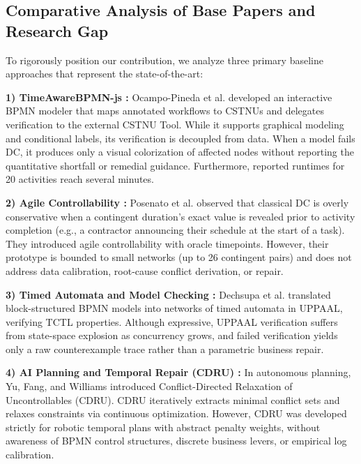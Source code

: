 \documentclass[conference]{IEEEtran}
\begin{document}
\subsection{Comparative Analysis of Base Papers and Research Gap}
To rigorously position our contribution, we analyze three primary baseline approaches that represent the state-of-the-art:

\textbf{1) TimeAwareBPMN-js \cite{ocampo2022}:} Ocampo-Pineda et al. developed an interactive BPMN modeler that maps annotated workflows to CSTNUs and delegates verification to the external CSTNU Tool. While it supports graphical modeling and conditional labels, its verification is decoupled from data. When a model fails DC, it produces only a visual colorization of affected nodes without reporting the quantitative shortfall or remedial guidance. Furthermore, reported runtimes for 20 activities reach several minutes.

\textbf{2) Agile Controllability \cite{posenato2024}:} Posenato et al. observed that classical DC is overly conservative when a contingent duration's exact value is revealed prior to activity completion (e.g., a contractor announcing their schedule at the start of a task). They introduced agile controllability with oracle timepoints. However, their prototype is bounded to small networks (up to 26 contingent pairs) and does not address data calibration, root-cause conflict derivation, or repair.

\textbf{3) Timed Automata and Model Checking \cite{dechsupa2025}:} Dechsupa et al. translated block-structured BPMN models into networks of timed automata in UPPAAL, verifying TCTL properties. Although expressive, UPPAAL verification suffers from state-space explosion as concurrency grows, and failed verification yields only a raw counterexample trace rather than a parametric business repair.

\textbf{4) AI Planning and Temporal Repair (CDRU) \cite{yu2014}:} In autonomous planning, Yu, Fang, and Williams introduced Conflict-Directed Relaxation of Uncontrollables (CDRU). CDRU iteratively extracts minimal conflict sets and relaxes constraints via continuous optimization. However, CDRU was developed strictly for robotic temporal plans with abstract penalty weights, without awareness of BPMN control structures, discrete business levers, or empirical log calibration.
\end{document}
